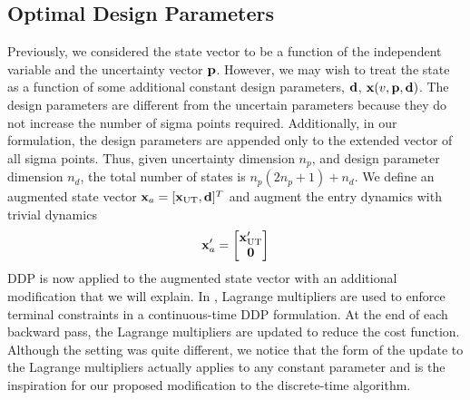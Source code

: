  
\subsection{Optimal Design Parameters}\label{Sec:DesignOptimization}
Previously, we considered the state vector to be a function of the independent variable and the uncertainty vector $\mathbf{p}$. However, we may wish to treat the state as a function of some additional constant design parameters, $\mathbf{d}$, $\mathbf{x}(v, \mathbf{p}, \mathbf{d})$. The design parameters are different from the uncertain parameters because they do not increase the number of sigma points required. Additionally, in our formulation, the design parameters are appended only to the extended vector of all sigma points. Thus, given uncertainty dimension $n_p$, and design parameter dimension $n_d$, the total number of states is $n_p(2n_p+1) + n_d$. We define an augmented state vector $\mathbf{x}_a = [\mathbf{x}_{\mathrm{UT}}, \mathbf{d}]^T$ 
and augment the entry dynamics with trivial dynamics
\begin{align}
	\mathbf{x}_a' = 
	\begin{bmatrix}
		\mathbf{x}_{\mathrm{UT}}' \\
		\mathbf{0}
	\end{bmatrix}
\end{align}
DDP is now applied to the augmented state vector with an additional modification that we will explain. In \cite{DDP:ContinuousTerminalConstraints}, Lagrange multipliers are used to enforce terminal constraints in a continuous-time DDP formulation. At the end of each backward pass, the Lagrange multipliers are updated to reduce the cost function. Although the setting was quite different, we notice that the form of the update to the Lagrange multipliers actually applies to any constant parameter and is the inspiration for our proposed modification to the discrete-time algorithm.

